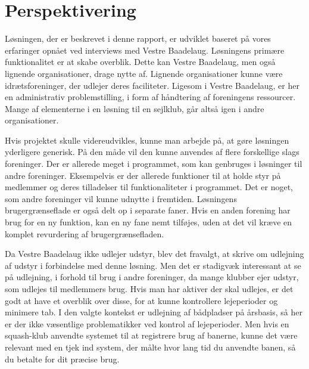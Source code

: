 \chapter{Perspektivering}
\label{cha:perspektivering}

Løsningen, der er beskrevet i denne rapport, er udviklet baseret på vores erfaringer opnået ved interviews med Vestre Baadelaug. Løsningens primære funktionalitet er at skabe overblik. Dette kan Vestre Baadelaug, men også lignende organisationer, drage nytte af. Lignende organisationer kunne være idrætsforeninger, der udlejer deres faciliteter. Ligesom i Vestre Baadelaug, er her en administrativ problemstilling, i form af håndtering af foreningens ressourcer. Mange af elementerne i en løsning til en sejlklub, går altså igen i andre organisationer.

Hvis projektet skulle videreudvikles, kunne man arbejde på, at gøre løsningen yderligere generisk. På den måde vil den kunne anvendes af flere forskellige slags foreninger. Der er allerede meget i programmet, som kan genbruges i løsninger til andre foreninger. Eksempelvis er der allerede funktioner til at holde styr på medlemmer og deres tilladelser til funktionaliteter i programmet. Det er noget, som andre foreninger vil kunne udnytte i fremtiden. Løsningens brugergrænseflade er også delt op i separate faner. Hvis en anden forening har brug for en ny funktion, kan en ny fane nemt tilføjes, uden at det vil kræve en komplet revurdering af brugergrænsefladen.

Da Vestre Baadelaug ikke udlejer udstyr, blev det fravalgt, at skrive om udlejning af udstyr i forbindelse med denne løsning. Men det er stadigvæk interessant at se på udlejning, i forhold til brug i andre foreninger, da mange klubber ejer udstyr, som udlejes til medlemmers brug. Hvis man har aktiver der skal udlejes, er det godt at have et overblik over disse, for at kunne kontrollere lejeperioder og minimere tab. I den valgte kontekst er udlejning af bådpladser på årsbasis, så her er der ikke væsentlige problematikker ved kontrol af lejeperioder. Men hvis en squash-klub anvendte systemet til at registrere brug af banerne, kunne det være relevant med en tjek ind system, der målte hvor lang tid du anvendte banen, så du betalte for dit præcise brug.

